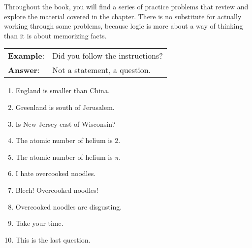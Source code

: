 

Throughout the book, you will find a series of practice problems that review and explore the material covered in the chapter. There is no substitute for actually working through some problems, because logic is more about a way of thinking than it is about memorizing facts. %


\begin{longtabu} to \textwidth {X[1.2,p]X[6,p]}
\textbf{Example}: & Did you follow the instructions? \\
\textbf{Answer}: & Not a statement, a question. \\
\end{longtabu}


\begin{enumerate}
\item England is smaller than China. %
\item Greenland is south of Jerusalem. %
\item Is New Jersey east of Wisconsin? %
\item The atomic number of helium is 2. %
\item The atomic number of helium is $\pi$. %
\item I hate overcooked noodles. %
\item Blech! Overcooked noodles! %
\item Overcooked noodles are disgusting.%
\item Take your time. %
\item This is the last question. %
\end{enumerate}


